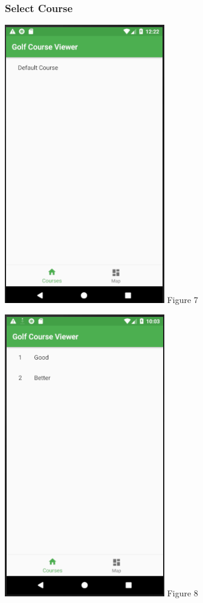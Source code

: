 \documentclass{article}
\begin{document}
	\subsubsection{Select Course}
	\includegraphics[scale=0.7]{CourseListUI.PNG}
	\linebreak
	Figure 7
	
	\includegraphics[scale=0.7]{Holes.PNG}
	\linebreak
	Figure 8
	
\end{document}
